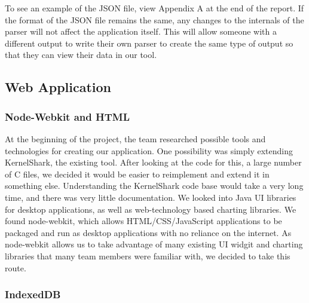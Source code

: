\documentclass{hmcclinic}
\begin{document}
  To see an example of the JSON file, view Appendix A at the end of the report.
  \newline
  \newline
  If the format of the JSON file remains the same, any changes to the internals of the
  parser will not affect the application itself. This will allow
  someone with a different output to write their own parser to create the same
  type of output so that they can view their data in our tool.

  \subsection{Web Application}

  
  \subsubsection{Node-Webkit and HTML} %
    At the beginning of the project, the team researched possible tools and
    technologies for creating our application. One possibility was simply
    extending KernelShark, the existing tool. After looking at the code for
    this, a large number of C files, we decided it would be easier to
    reimplement and extend it in something else. Understanding the KernelShark code base
    would take a very long time, and there was very little documentation. We
    looked into Java UI libraries for desktop applications, as well as
    web-technology based charting libraries.  We found node-webkit, which allows
    HTML/CSS/JavaScript applications to be packaged and run as desktop
    applications with no reliance on the internet. As node-webkit allows us to
    take advantage of many existing UI widgit and charting libraries that many
    team members were familiar with, we decided to take this route.

  \subsubsection{IndexedDB}
\end{document}
